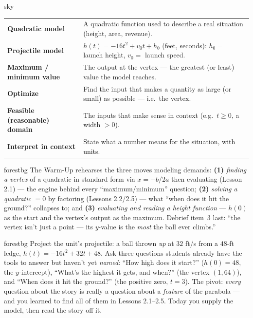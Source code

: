 \documentclass[10pt]{article}
\begin{document}
\begin{skillbox}{sky}
\renewcommand{\arraystretch}{1.3}
\begin{tabularx}{\linewidth}{@{}l X@{}}
\textbf{Quadratic model} & A quadratic function used to describe a real situation (height, area, revenue). \\
\textbf{Projectile model} & $h(t)=-16t^2+v_0t+h_0$ (feet, seconds): $h_0=$ launch height, $v_0=$ launch speed. \\
\textbf{Maximum / minimum value} & The output at the vertex --- the greatest (or least) value the model reaches. \\
\textbf{Optimize} & Find the input that makes a quantity as large (or small) as possible --- i.e.\ the vertex. \\
\textbf{Feasible (reasonable) domain} & The inputs that make sense in context (e.g.\ $t\ge0$, a width $>0$). \\
\textbf{Interpret in context} & State what a number means for the situation, with units. \\
\end{tabularx}
\end{skillbox}

\begin{fixedskillbox}{forestbg}
    The Warm-Up rehearses the three moves modeling demands: \textbf{(1)} \emph{finding a vertex} of a quadratic in
    standard form via $x=-b/2a$ then evaluating (Lesson 2.1) --- the engine behind every ``maximum/minimum''
    question; \textbf{(2)} \emph{solving a quadratic} $=0$ by factoring (Lessons 2.2/2.5) --- what ``when does it hit
    the ground?'' collapses to; and \textbf{(3)} \emph{evaluating and reading a height function} --- $h(0)$ as the
    start and the vertex's output as the maximum. Debrief item~3 last: ``the vertex isn't just a point --- its
    $y$-value is the \emph{most} the ball ever climbs.''
\end{fixedskillbox}

\begin{skillbox}[Hook]{forestbg}
    Project the unit's projectile: a ball thrown \emph{up} at $32$ ft/s from a $48$-ft ledge, $h(t)=-16t^2+32t+48$.
    Ask three questions students already have the tools to answer but haven't yet \emph{named}: ``How high does it
    start?'' ($h(0)=48$, the $y$-intercept), ``What's the highest it gets, and when?'' (the vertex $(1,64)$), and
    ``When does it hit the ground?'' (the positive zero, $t=3$). The pivot: \emph{every} question about the story is
    really a question about a \emph{feature} of the parabola --- and you learned to find all of them in Lessons
    2.1--2.5. Today you supply the model, then read the story off it.
\end{skillbox}
\end{document}
